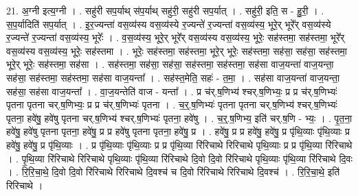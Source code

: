 \documentclass[17pt]{extarticle}
\begin{document}
21. अ॒ग्नी इत्य॒ग्नी । . सहु॑री सप॒र्याथ् स॑प॒र्याथ् सहु॑री॒ सहु॑री सप॒र्यात् । . सहु॑री॒ इति॒ स - हु॒री॒ । . स॒प॒र्यादिति॑ सप॒र्यात् । . इ॒र॒ज्यन्ता॑ वस॒व्य॑स्य वस॒व्य॑स्ये र॒ज्यन्ते॑ र॒ज्यन्ता॑ वस॒व्य॑स्य॒ भूरे॒र् भूरे᳚र् वस॒व्य॑स्ये र॒ज्यन्ते॑ र॒ज्यन्ता॑ वस॒व्य॑स्य॒ भूरेः᳚ । . व॒स॒व्य॑स्य॒ भूरे॒र् भूरे᳚र् वस॒व्य॑स्य वस॒व्य॑स्य॒ भूरेः॒ सह॑स्तमा॒ सह॑स्तमा॒ भूरे᳚र् वस॒व्य॑स्य वस॒व्य॑स्य॒ भूरेः॒ सह॑स्तमा । . भूरेः॒ सह॑स्तमा॒ सह॑स्तमा॒ भूरे॒र् भूरेः॒ सह॑स्तमा॒ सह॑सा॒ सह॑सा॒ सह॑स्तमा॒ भूरे॒र् भूरेः॒ सह॑स्तमा॒ सह॑सा । . सह॑स्तमा॒ सह॑सा॒ सह॑सा॒ सह॑स्तमा॒ सह॑स्तमा॒ सह॑सा वाज॒यन्ता॑ वाज॒यन्ता॒ सह॑सा॒ सह॑स्तमा॒ सह॑स्तमा॒ सह॑सा वाज॒यन्ता᳚ । . सह॑स्त॒मेति॒ सहः॑ - त॒मा॒ । . सह॑सा वाज॒यन्ता॑ वाज॒यन्ता॒ सह॑सा॒ सह॑सा वाज॒यन्ता᳚ । . वा॒ज॒यन्तेति॑ वाज - यन्ता᳚ । . प्र च॑र्.ष॒णिभ्य॑ श्चर्.ष॒णिभ्यः॒ प्र प्र च॑र्.ष॒णिभ्यः॑ पृतना पृतना चर्.ष॒णिभ्यः॒ प्र प्र च॑र्.ष॒णिभ्यः॑ पृतना । . च॒र्॒.ष॒णिभ्यः॑ पृतना पृतना चर्.ष॒णिभ्य॑ श्चर्.ष॒णिभ्यः॑ पृतना॒ हवे॑षु॒ हवे॑षु पृतना चर्.ष॒णिभ्य॑ श्चर्.ष॒णिभ्यः॑ पृतना॒ हवे॑षु । . च॒र्॒.ष॒णिभ्य॒ इति॑ चर्.ष॒णि - भ्यः॒ । . पृ॒त॒ना॒ हवे॑षु॒ हवे॑षु पृतना पृतना॒ हवे॑षु॒ प्र प्र हवे॑षु पृतना पृतना॒ हवे॑षु॒ प्र । . हवे॑षु॒ प्र प्र हवे॑षु॒ हवे॑षु॒ प्र पृ॑थि॒व्याः पृ॑थि॒व्याः प्र हवे॑षु॒ हवे॑षु॒ प्र पृ॑थि॒व्याः । . प्र पृ॑थि॒व्याः पृ॑थि॒व्याः प्र प्र पृ॑थि॒व्या रि॑रिचाथे रिरिचाथे पृथि॒व्याः प्र प्र पृ॑थि॒व्या रि॑रिचाथे । . पृ॒थि॒व्या रि॑रिचाथे रिरिचाथे पृथि॒व्याः पृ॑थि॒व्या रि॑रिचाथे दि॒वो दि॒वो रि॑रिचाथे पृथि॒व्याः पृ॑थि॒व्या रि॑रिचाथे दि॒वः । . रि॒रि॒चा॒थे॒ दि॒वो दि॒वो रि॑रिचाथे रिरिचाथे दि॒वश्च॑ च दि॒वो रि॑रिचाथे रिरिचाथे दि॒वश्च॑ । . रि॒रि॒चा॒थे॒ इति॑ रिरिचाथे । \newline
\end{document}
